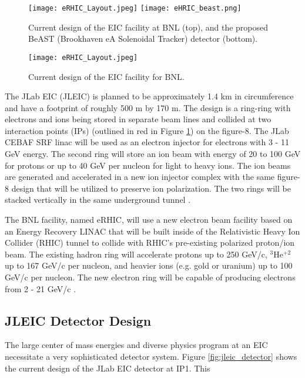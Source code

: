 \begin{figure}[ht]
	\centering
	\texttt{[image: eRHIC\_Layout.jpeg]}
	\texttt{[image: eHRIC\_beast.png]}
	\caption{Current design of the EIC facility at BNL (top), and the proposed BeAST (Brookhaven eA Solenoidal Tracker) detector (bottom).}
	\label{fig:jleic_layout}
\end{figure}

\begin{figure}[ht]
	\centering
	\texttt{[image: eRHIC\_Layout.jpeg]}
	\caption{Current design of the EIC facility for BNL.}
	\label{fig:erhic_layout}
\end{figure}

The JLab EIC (JLEIC) is planned to be approximately 1.4 km in circumference and have a footprint of roughly 500 m by 170 m. The design is a ring-ring with electrons and ions being stored in separate beam lines and collided at two interaction points  (IPs) (outlined in red in Figure \ref{fig:jleic_layout}) on the figure-8. The JLab CEBAF SRF linac will be used as an electron injector for electrons with 3 - 11 GeV energy. The second ring will store an ion beam with energy of 20 to 100 GeV for protons or up to 40 GeV per nucleon for light to heavy ions. The ion beams are generated and accelerated in a new ion injector complex with the same figure-8 design that will be utilized to preserve ion polarization. The two rings will be stacked vertically in the same underground tunnel \cite{JLEICdesign}.

The BNL facility, named eRHIC, will use a new electron beam facility based on an Energy Recovery LINAC that will be built inside of the Relativistic Heavy Ion Collider (RHIC) tunnel to collide with RHIC's pre-existing polarized proton/ion beam. The existing hadron ring will accelerate protons up to 250 GeV/c, $^3$He$^{+2}$ up to 167 GeV/c per nucleon, and heavier ions (e.g. gold or uranium) up to 100 GeV/c per nucleon. The new electron ring will be capable of producing electrons from 2 - 21 GeV/c \cite{eRHICdesign}.

\subsection{JLEIC Detector Design}
The large center of mass energies and diverse physics program at an EIC necessitate a very sophisticated detector system. Figure \ref{fig:jleic_detector} shows the current design of the JLab EIC detector at IP1. This 

